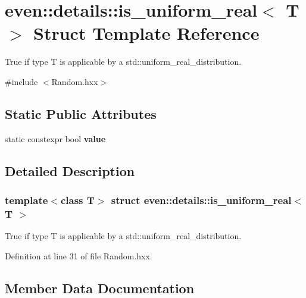 \hypertarget{structeven_1_1details_1_1is__uniform__real}{}\section{even\+:\+:details\+:\+:is\+\_\+uniform\+\_\+real$<$ T $>$ Struct Template Reference}
\label{structeven_1_1details_1_1is__uniform__real}


True if type T is applicable by a std\+::uniform\+\_\+real\+\_\+distribution.  




{\ttfamily \#include $<$Random.\+hxx$>$}

\subsection*{Static Public Attributes}
\begin{DoxyCompactItemize}
\item 
static constexpr bool {\bfseries value}
\end{DoxyCompactItemize}


\subsection{Detailed Description}
\subsubsection*{template$<$class T$>$\newline
struct even\+::details\+::is\+\_\+uniform\+\_\+real$<$ T $>$}

True if type T is applicable by a std\+::uniform\+\_\+real\+\_\+distribution. 

Definition at line 31 of file Random.\+hxx.



\subsection{Member Data Documentation}
\mbox{\label{structeven_1_1details_1_1is__uniform__real_a08c410ace968ca5be572b213f629154f}} 
